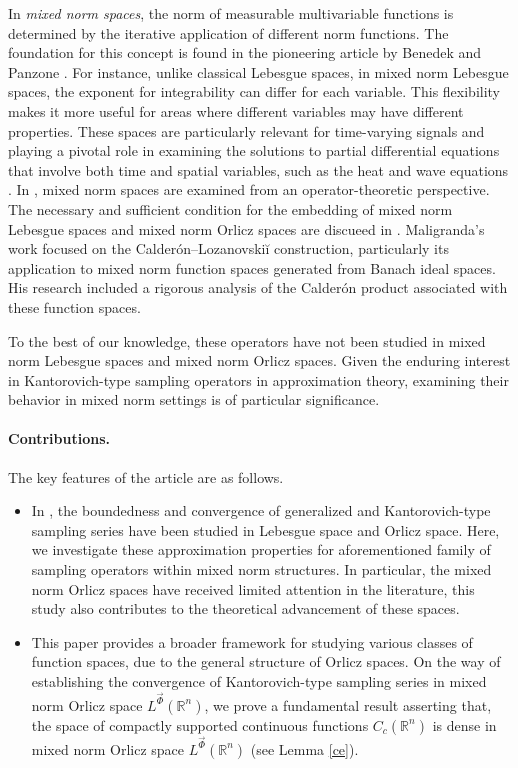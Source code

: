 \documentclass[11pt, a4paper]{article}
\theoremstyle{definition}
\numberwithin{equation}{section}
\def\RR{\mathbb R}
\begin{document}
In \emph{mixed norm spaces}, the norm of measurable multivariable functions is determined by the iterative  application of different norm functions. The foundation for this concept is found in the pioneering article by Benedek and Panzone \cite{dct}. For instance, unlike classical Lebesgue spaces, in mixed norm Lebesgue spaces, the exponent for integrability can differ for each variable. This flexibility
makes it more useful for areas where different variables may have different properties.  
These spaces are particularly relevant for time-varying signals \cite{sun} and playing a pivotal role in examining the solutions to partial differential equations that involve both time and spatial variables, such as the heat and wave equations \cite{heat}. 
In \cite{dct,burenkov,grey, vitali, pq}, mixed norm spaces are examined from an operator-theoretic perspective. The necessary and sufficient condition for the embedding of mixed norm Lebesgue spaces and mixed norm Orlicz spaces are discueed in \cite{pq}. Maligranda’s work \cite{3} focused on the Calderón–Lozanovskiĭ construction, particularly its application to mixed norm function spaces generated from Banach ideal spaces. His research included a rigorous analysis of the Calderón product associated with these function spaces.

To the best of our knowledge, these operators have not been studied in mixed norm Lebesgue spaces and mixed norm Orlicz spaces. Given the enduring interest in Kantorovich-type sampling operators in approximation theory, examining their behavior in mixed norm settings is of particular significance.

\paragraph{Contributions.} The key features of the article are as follows.
\begin{itemize}
    \item   In \cite{delta, bardaro10, multi}, the boundedness and convergence of generalized and Kantorovich-type sampling series have been studied in Lebesgue space and Orlicz space. Here, we investigate these approximation properties for aforementioned family of sampling operators within mixed norm structures.  In particular, the mixed norm Orlicz spaces have received limited attention in the literature, this study also contributes to the theoretical advancement of these spaces.
   
    \item This paper provides a broader framework for studying various classes of function spaces, due to the general structure of Orlicz spaces. On the way of establishing the convergence of Kantorovich-type sampling series in mixed norm Orlicz space $ L^{\overrightarrow{\Phi}}(\mathbb{R}^n)$, we prove a fundamental result asserting that, the space of compactly supported continuous functions $C_{c}(\RR^{n})$ is dense in mixed norm Orlicz space $ L^{\overrightarrow{\Phi}}(\mathbb{R}^n)$ (see Lemma \ref{ce}).
\end{itemize}
	
\end{document}
